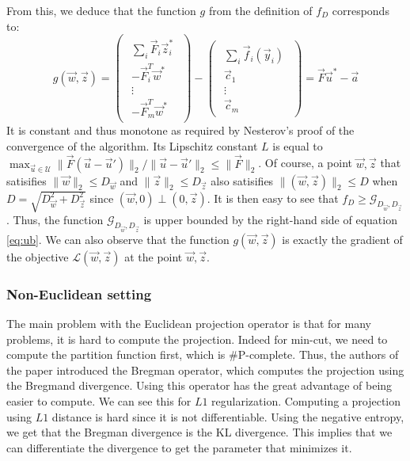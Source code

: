 From this, we deduce that the function $g$ from the definition of $f_D$ corresponds to:
\begin{equation}
  g(\vec w, \vec z) =
  \begin{pmatrix}
    \begin{array}{c}
      \sum_i \vec F_i \vec z_i^*\\
      - \vec F_i^T \vec w^*\\
      \vdots\\
      - \vec F_m^T \vec w^*
    \end{array}
  \end{pmatrix} -
  \begin{pmatrix}
    \begin{array}{c}
      \sum_i \vec f_i (\vec y_i)\\
      \vec c_1\\
      \vdots\\
      \vec c_m
    \end{array}
  \end{pmatrix} = \vec F \vec u^* - \vec a
\end{equation}
It is constant and thus monotone as required by Nesterov's proof of the
convergence of the algorithm. Its Lipschitz constant $L$ is equal to $\max_{\vec
u \in \mathcal{U}} \lVert \vec F (\vec u - \vec u') \rVert_2 / \lVert \vec u -
\vec u' \rVert_2 \leq \lVert \vec F \rVert_2$. Of course, a point $\vec w, \vec
z$ that satisifies $\lVert \vec w \rVert_2 \leq D_{\vec w}$ and $\lVert \vec z
\rVert_2 \leq D_{\vec z}$ also satisifies $\lVert (\vec w, \vec z) \rVert_2 \leq
D$ when $D = \sqrt{D_{\vec w}^2 + D_{\vec z}^2}$ since $(\vec w, 0) \perp (0,
\vec z)$. It is then easy to see that $f_D \geq \mathcal{G}_{D_{\vec w}, D_{\vec
z}}$. Thus, the function $\mathcal{G}_{D_{\vec w}, D_{\vec z}}$ is upper bounded
by the right-hand side of equation \ref{eq:ub}. We can also observe that the
function $g(\vec w, \vec z)$ is exactly the gradient of the objective
$\mathcal{L}(\vec w, \vec z)$ at the point $\vec w, \vec z$.

\subsubsection{Non-Euclidean setting}
The main problem with the Euclidean projection operator is that for many
problems, it is hard to compute the projection. Indeed for min-cut, we need to
compute the partition function first, which is \#P-complete. Thus, the authors
of the paper introduced the Bregman operator, which computes the projection
using the Bregmand divergence. Using this operator has the great advantage of
being easier to compute. We can see this for $L1$ regularization. Computing a
projection using $L1$ distance is hard since it is not differentiable. Using the
negative entropy, we get that the Bregman divergence is the KL divergence. This
implies that we can differentiate the divergence to get the parameter that
minimizes it.

